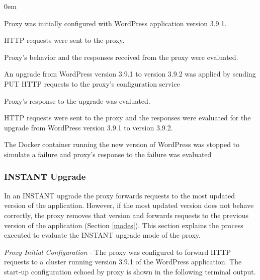 \documentclass[a4paper,11pt,twoside]{report}
\begin{document}
\begin{list}{-}{}
  \itemsep0em
  \item Proxy was initially configured with WordPress application version 3.9.1. 
  \item HTTP requests were sent to the proxy.
  \item Proxy's behavior and the responses received from the proxy  were evaluated. 
  \item An upgrade from WordPress version 3.9.1 to version 3.9.2 was applied by sending PUT HTTP requests to the proxy's configuration service
  \item Proxy's response to the upgrade was evaluated.
  \item HTTP requests were sent to the proxy and the responses were evaluated for the upgrade from WordPress version 3.9.1 to version 3.9.2.
  \item The Docker container running the new version of WordPress was stopped to simulate a failure and proxy's response to the failure was evaluated   
\end{list} 

\subsubsection*{INSTANT Upgrade}
In an INSTANT upgrade the proxy  forwards requests to the most updated version of the application. However, if the most updated version does not behave correctly, the proxy removes that version and forwards requests to the previous version of the application (Section \ref{modes}). This section explains the process executed to evaluate the INSTANT upgrade mode of the proxy.\medskip

\noindent
\textit{Proxy Initial Configuration} - The proxy was configured to forward HTTP requests to a cluster running version 3.9.1 of the WordPress application. The start-up configuration echoed by proxy is shown in the following terminal output.\smallskip
\end{document}
